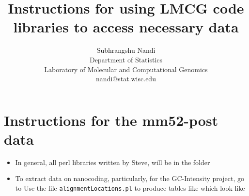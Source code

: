 \documentclass[11pt]{article}
\begin{document}
\title{Instructions for using LMCG code libraries to access necessary data}
\author{Subhrangshu Nandi\\
  Department of Statistics\\
  Laboratory of Molecular and Computational Genomics\\
  nandi@stat.wisc.edu}
\maketitle

\tableofcontents

\section{Instructions for the mm52-post data}
\begin{itemize}
\item In general, all perl libraries written by Steve, will be in the folder 
\item
To extract data on nanocoding, particularly, for the GC-Intensity project, go to 
Use the file \texttt{alignmentLocations.pl} to produce tables like 
which look like
\end{itemize}
\end{document}
